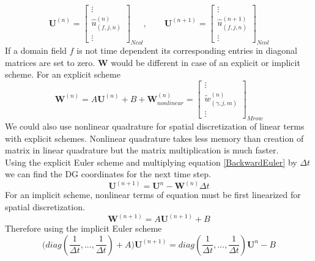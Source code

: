 \documentclass[BoSSSForSolvingConservationLaws.tex]{subfiles}
\begin{document}
\begin{equation*}
\textbf{U}^{(n)}=
\begin{bmatrix}
\vdots\\
\hat{u}_{(f,j,n)}^{(n)}\\
\vdots
\end{bmatrix}_{Ncol},\qquad
\textbf{U}^{(n+1)}=
\begin{bmatrix}
\vdots\\
\hat{u}_{(f,j,n)}^{(n+1)}\\
\vdots
\end{bmatrix}_{Ncol}
\end{equation*}
If a domain field $f$ is not time dependent its corresponding entries in diagonal matrices are set to zero. $\textbf{W}$ would be different in case of an explicit or implicit scheme. For an explicit scheme
\begin{equation*}
\textbf{W}^{(n)}=A\textbf{U}^{(n)}+B+\textbf{W}^{(n)}_{nonlinear}=
\begin{bmatrix}
\vdots\\
\tilde{w}_{(\gamma,j,m)}^{(n)}\\
\vdots
\end{bmatrix}_{Mrow}
\end{equation*}
We could also use nonlinear quadrature for spatial discretization of linear terms with explicit schemes. Nonlinear quadrature takes less memory than creation of matrix in linear quadrature but the matrix multiplication is much faster.\\
Using the explicit Euler scheme and multiplying equation \eqref{BackwardEuler} by $\Delta t$ we can find the DG coordinates for the next time step.
\begin{equation}
\textbf{U}^{(n+1)}=\textbf{U}^n-\textbf{W}^{(n)} \Delta t
\end{equation}
For an implicit scheme, nonlinear terms of equation must be first linearized for spatial discretization.
\[
\textbf{W}^{(n+1)}=A\textbf{U}^{(n+1)}+B
\]
Therefore using the implicit Euler scheme
\begin{equation}
\label{ImplicitEuler}
\Big(diag(\frac{1}{\Delta t},...,\frac{1}{\Delta t})+A \Big)\textbf{U}^{(n+1)}=
diag(\frac{1}{\Delta t},...,\frac{1}{\Delta t})\textbf{U}^n-B
\end{equation}
\end{document}
